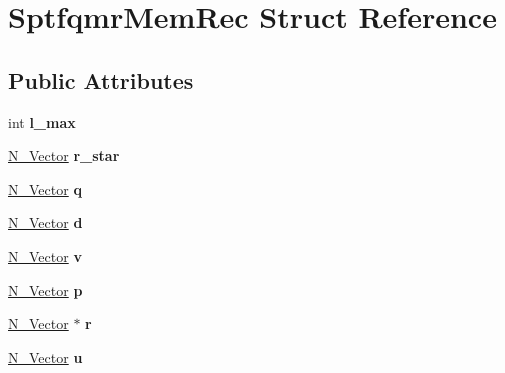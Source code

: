 \hypertarget{structSptfqmrMemRec}{}\section{Sptfqmr\+Mem\+Rec Struct Reference}
\label{structSptfqmrMemRec}
\subsection*{Public Attributes}
\begin{DoxyCompactItemize}
\item 
\mbox{\label{structSptfqmrMemRec_ac812d508901017d5e6205e2181f525af}} 
int {\bfseries l\+\_\+max}
\item 
\mbox{\label{structSptfqmrMemRec_af272d29f7c3a85ea4748e112b21868de}} 
\mbox{\hyperlink{struct__generic__N__Vector}{N\+\_\+\+Vector}} {\bfseries r\+\_\+star}
\item 
\mbox{\label{structSptfqmrMemRec_af52070ca66e98cbb01c78ad0a7e5e3d9}} 
\mbox{\hyperlink{struct__generic__N__Vector}{N\+\_\+\+Vector}} {\bfseries q}
\item 
\mbox{\label{structSptfqmrMemRec_ae2df8359750a05b34c3ac13b3b4b7ca5}} 
\mbox{\hyperlink{struct__generic__N__Vector}{N\+\_\+\+Vector}} {\bfseries d}
\item 
\mbox{\label{structSptfqmrMemRec_a7721bf51cd706af328d3ab8d127dc6c5}} 
\mbox{\hyperlink{struct__generic__N__Vector}{N\+\_\+\+Vector}} {\bfseries v}
\item 
\mbox{\label{structSptfqmrMemRec_a501b599b060c618009fa2bb9ff035056}} 
\mbox{\hyperlink{struct__generic__N__Vector}{N\+\_\+\+Vector}} {\bfseries p}
\item 
\mbox{\label{structSptfqmrMemRec_a373aac832dd02e9b214c6976f08a0ef4}} 
\mbox{\hyperlink{struct__generic__N__Vector}{N\+\_\+\+Vector}} $\ast$ {\bfseries r}
\item 
\mbox{\label{structSptfqmrMemRec_a52d62caf8a77b4c3b01228ab535ceb2f}} 
\mbox{\hyperlink{struct__generic__N__Vector}{N\+\_\+\+Vector}} {\bfseries u}

\end{DoxyCompactItemize}
